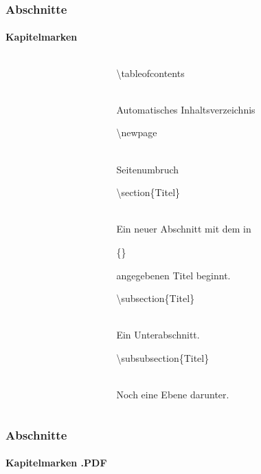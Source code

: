 
\begin{frame}
\frametitle{Abschnitte}
\framesubtitle{Kapitelmarken}
\begin{columns}
\begin{column}{0.5\textwidth}
\begin{ttfamily}\footnotesize

\end{ttfamily}
\end{column}
\begin{column}{0.5\textwidth}

\begin{ttfamily}\color{nounibaredI}\textbackslash tableofcontents\color{black}\end{ttfamily}\\
Automatisches Inhaltsverzeichnis\\[3mm]
\begin{ttfamily}\color{nounibaredI}\textbackslash newpage\color{black}\end{ttfamily}\\
Seitenumbruch\\[3mm]
\begin{ttfamily}\color{unibablueI}\textbackslash section\color{black}\{Titel\}\end{ttfamily}\\
Ein neuer Abschnitt mit dem in \begin{ttfamily}\{\}\end{ttfamily} angegebenen Titel
beginnt.\\[3mm]
\begin{ttfamily}\color{unibablueI}\textbackslash subsection\color{black}\{Titel\}\end{ttfamily}\\
Ein Unterabschnitt.\\[3mm]
\begin{ttfamily}\color{unibablueI}\textbackslash subsubsection\color{black}\{Titel\}\end{ttfamily}\\
Noch eine Ebene darunter.\\
\end{column}
\end{columns}
\end{frame}


\begin{frame}
\frametitle{Abschnitte}
\framesubtitle{Kapitelmarken .PDF}
\begin{columns}
\begin{column}{0.5\textwidth}
\begin{ttfamily}\footnotesize

\end{ttfamily}
\end{column}
\begin{column}{0.5\textwidth}
\end{column}
\end{columns}
\end{frame}

